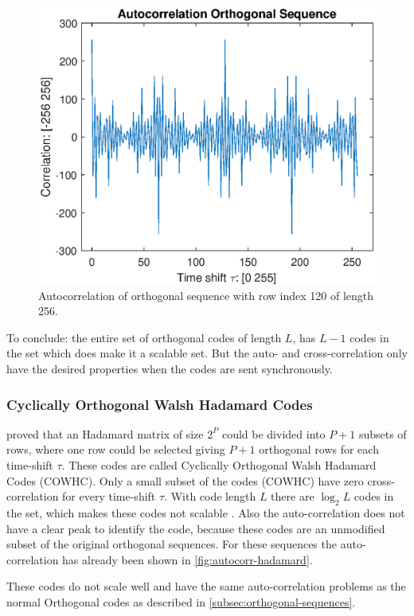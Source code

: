 \begin{figure}[t]
	\centering
	\includegraphics[width=\textwidth]{chapters/cdma-chapters/codes/autocorr-hadamard.eps}
	\caption{Autocorrelation of orthogonal sequence with row index 120 of length 256.}
	\label{fig:autocorr-hadamard}
\end{figure}





To conclude: the entire set of orthogonal codes of length $L$, has $L - 1$ codes in the set which does make it a scalable set.
But the auto- and cross-correlation only have the desired properties when the codes are sent synchronously. 




\subsubsection{Cyclically Orthogonal Walsh Hadamard Codes}


\cite{1182447} proved that an Hadamard matrix of size $2^P$ could be divided into $P + 1$ subsets of rows, where one row could be selected giving $P + 1$ orthogonal rows for each time-shift $\tau$.
These codes are called Cyclically Orthogonal Walsh Hadamard Codes (COWHC).
Only a small subset of the codes (COWHC) have zero cross-correlation for every time-shift $\tau$.
With code length $L$ there are $\log_2 L$ codes in the set, which makes these codes not scalable \cite{1182447}. 
Also the auto-correlation does not have a clear peak to identify the code, because these codes are an unmodified subset of the original orthogonal sequences.
For these sequences the auto-correlation has already been shown in \autoref{fig:autocorr-hadamard}.

These codes do not scale well and have the same auto-correlation problems as the normal Orthogonal codes as described in \autoref{subsec:orthogonal-sequences}.
